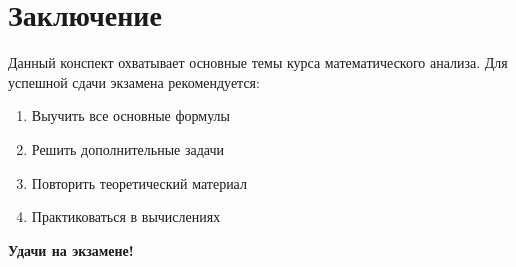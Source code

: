 \documentclass[12pt,a4paper]{report}
\begin{document}
\chapter*{Заключение}

Данный конспект охватывает основные темы курса математического анализа. Для успешной сдачи экзамена рекомендуется:

\begin{enumerate}
    \item Выучить все основные формулы
    \item Решить дополнительные задачи
    \item Повторить теоретический материал
    \item Практиковаться в вычислениях
\end{enumerate}

\textbf{Удачи на экзамене!}
\end{document}
